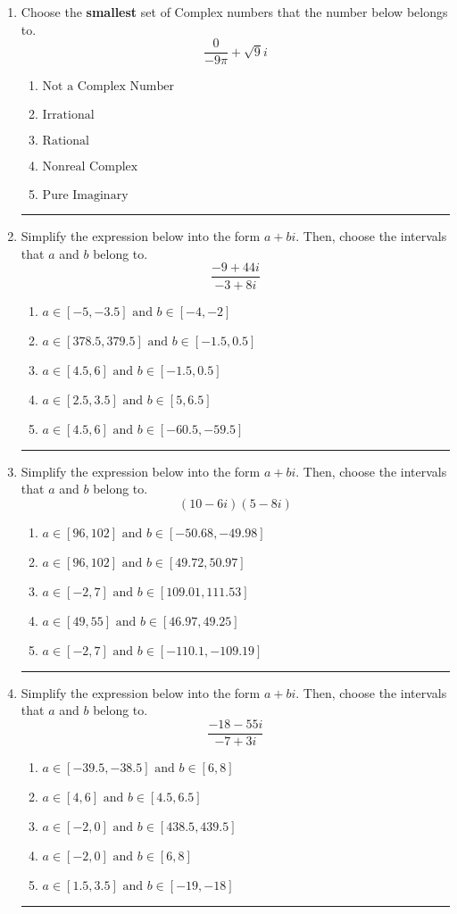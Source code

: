 \documentclass[14pt]{extbook}
\newcommand{\litem}[1]{\item#1\hspace*{-1cm}\rule{\textwidth}{0.4pt}}
\begin{document}
\begin{enumerate}
{\begin{enumerate}[label=\Alph*.]
\end{enumerate} }
\litem{
Choose the \textbf{smallest} set of Complex numbers that the number below belongs to.\[ \frac{0}{-9 \pi}+\sqrt{9}i \]\begin{enumerate}[label=\Alph*.]
\item \( \text{Not a Complex Number} \)
\item \( \text{Irrational} \)
\item \( \text{Rational} \)
\item \( \text{Nonreal Complex} \)
\item \( \text{Pure Imaginary} \)

\end{enumerate} }
\litem{
Simplify the expression below into the form $a+bi$. Then, choose the intervals that $a$ and $b$ belong to.\[ \frac{-9 + 44 i}{-3 + 8 i} \]\begin{enumerate}[label=\Alph*.]
\item \( a \in [-5, -3.5] \text{ and } b \in [-4, -2] \)
\item \( a \in [378.5, 379.5] \text{ and } b \in [-1.5, 0.5] \)
\item \( a \in [4.5, 6] \text{ and } b \in [-1.5, 0.5] \)
\item \( a \in [2.5, 3.5] \text{ and } b \in [5, 6.5] \)
\item \( a \in [4.5, 6] \text{ and } b \in [-60.5, -59.5] \)

\end{enumerate} }
\litem{
Simplify the expression below into the form $a+bi$. Then, choose the intervals that $a$ and $b$ belong to.\[ (10 - 6 i)(5 - 8 i) \]\begin{enumerate}[label=\Alph*.]
\item \( a \in [96, 102] \text{ and } b \in [-50.68, -49.98] \)
\item \( a \in [96, 102] \text{ and } b \in [49.72, 50.97] \)
\item \( a \in [-2, 7] \text{ and } b \in [109.01, 111.53] \)
\item \( a \in [49, 55] \text{ and } b \in [46.97, 49.25] \)
\item \( a \in [-2, 7] \text{ and } b \in [-110.1, -109.19] \)

\end{enumerate} }
\litem{
Simplify the expression below into the form $a+bi$. Then, choose the intervals that $a$ and $b$ belong to.\[ \frac{-18 - 55 i}{-7 + 3 i} \]\begin{enumerate}[label=\Alph*.]
\item \( a \in [-39.5, -38.5] \text{ and } b \in [6, 8] \)
\item \( a \in [4, 6] \text{ and } b \in [4.5, 6.5] \)
\item \( a \in [-2, 0] \text{ and } b \in [438.5, 439.5] \)
\item \( a \in [-2, 0] \text{ and } b \in [6, 8] \)
\item \( a \in [1.5, 3.5] \text{ and } b \in [-19, -18] \)


\end{enumerate}}
\end{enumerate}
\end{document}
